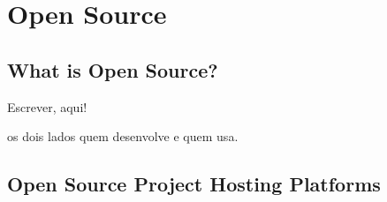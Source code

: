 \thispagestyle{empty}
\chapter{Open Source}\label{chap:open_source}


\section{What is Open Source?}

Escrever, aqui!

os dois lados quem desenvolve e quem usa.

\section{Open Source Project Hosting Platforms}

